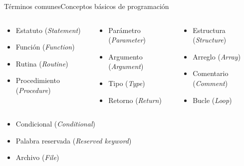 \documentclass[spanish, handout]{beamer}
\begin{document}
\begin{frame}{Términos comunes}{Conceptos básicos de programación}
    \begin{columns}
        \begin{column}{0.33\textwidth}
            \begin{itemize}
                \item Estatuto (\textit{Statement})
                \item Función (\textit{Function})
                \item Rutina (\textit{Routine})
                \item Procedimiento (\textit{Procedure})
            \end{itemize}
        \end{column}
        \begin{column}{0.33\textwidth}
            \begin{itemize}
                \item Parámetro (\textit{Parameter})
                \item Argumento (\textit{Argument})
                \item Tipo (\textit{Type})
                \item Retorno (\textit{Return})
            \end{itemize}
        \end{column}
        \begin{column}{0.3\textwidth}
            \begin{itemize}
                \item Estructura (\textit{Structure})
                \item Arreglo (\textit{Array})
                \item Comentario (\textit{Comment})
                \item Bucle (\textit{Loop})
            \end{itemize}
        \end{column}
    \end{columns}
    \begin{columns}
        \begin{column}{0.33\textwidth}
            \begin{itemize}
                \item Condicional (\textit{Conditional})
                \item Palabra reservada (\textit{Reserved keyword})
                \item Archivo (\textit{File})

\end{itemize}
\end{column}
\end{columns}
\end{frame}
\end{document}
